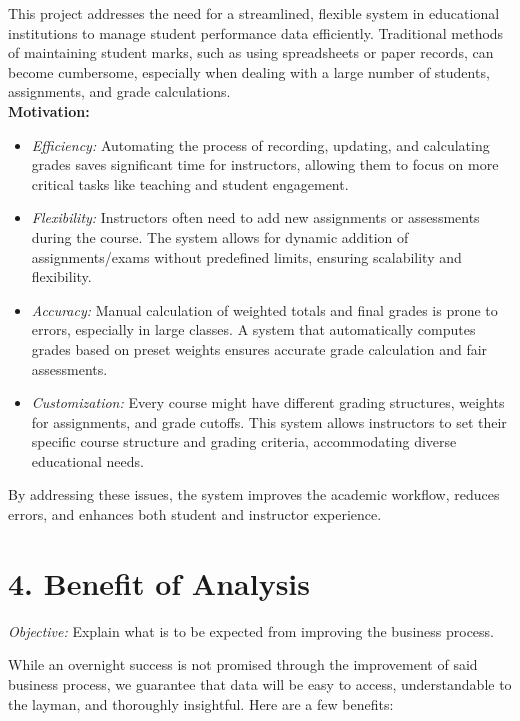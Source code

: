 \documentclass[12pt]{article}
\begin{document}
\noindent
This project addresses the need for a streamlined, flexible system in educational institutions to manage student performance data efficiently. Traditional methods of maintaining student marks, such as using spreadsheets or paper records, can become cumbersome, especially when dealing with a large number of students, assignments, and grade calculations.\\
\textbf{Motivation: }
\begin{itemize}
\item \textit{Efficiency:} Automating the process of recording, updating, and calculating grades saves significant time for instructors, allowing them to focus on more critical tasks like teaching and student engagement.
\item \textit{Flexibility:} Instructors often need to add new assignments or assessments during the course. The system allows for dynamic addition of assignments/exams without predefined limits, ensuring scalability and flexibility.
\item \textit{Accuracy:} Manual calculation of weighted totals and final grades is prone to errors, especially in large classes. A system that automatically computes grades based on preset weights ensures accurate grade calculation and fair assessments.
\item \textit{Customization:} Every course might have different grading structures, weights for assignments, and grade cutoffs. This system allows instructors to set their specific course structure and grading criteria, accommodating diverse educational needs.
\end{itemize}
By addressing these issues, the system improves the academic workflow, reduces errors, and enhances both student and instructor experience. 

\section*{4. Benefit of Analysis}
\textit{Objective:} Explain what is to be expected from improving the business process. 

\noindent
While an overnight success is not promised through the improvement of said business process, we guarantee that data will be easy to access, understandable to the layman, and thoroughly insightful. Here are a few benefits:
\end{document}
